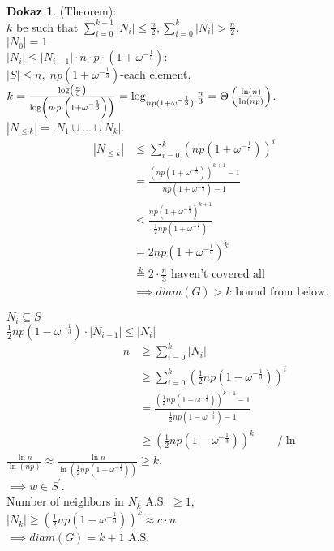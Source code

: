 \documentclass[a4paper, 12pt]{book}
\theoremstyle{definition}
\newtheorem{pro}[counter]{Dokaz}
\theoremstyle{remark}
\begin{document}
\begin{pro}(Theorem): \\
  $k$ be such that $\sum_{i=0}^{k-1} |N_i| \leq \frac{n}{2}, \sum_{i=0}^{k} |N_i| > \frac{n}{2}$. \\
  $|N_0| = 1$ \\
  $|N_i| \leq |N_{i-1}| \cdot n \cdot p \cdot (1+\omega^{-\frac{1}{3}})$: \\
  $|S| \leq n, \; np(1+\omega^{-\frac{1}{3}})$-each element. \\
  $k = \frac{\log \left(\frac{n}{3}\right)}{\log \left(n \cdot p \cdot \left(1+\omega^{-\frac{1}{3}}\right)\right)} \\
  = \log_{np(1+\omega^{-\frac{1}{3}})} \frac{n}{3} = \Theta\left(\frac{\ln(n)}{\ln(np)}\right)$. \\
  $|N_{\leq k}| = |N_1 \cup \dots \cup N_k|$.
  \begin{align*}
    |N_{\leq k}| &\leq \sum_{i=0}^{k} (np(1+\omega^{-\frac{1}{3}}))^i \\
    &= \frac{(np(1+\omega^{-\frac{1}{3}}))^{k+1}-1}{np(1+\omega^{-\frac{1}{3}}) - 1} \\
    &< \frac{np(1+\omega^{-\frac{1}{3}})^{k+1}}{\frac{1}{2} np(1+\omega^{-\frac{1}{3}})} \\
    &= 2 np(1+\omega^{-\frac{1}{3}})^k \\
    &\stackrel{k}{=} 2 \cdot \frac{n}{3} \text{ haven't covered all} \\
    &\implies diam(G) > k \text{ bound from below}.
  \end{align*}



  $N_i \subseteq S$ \\
  $\frac{1}{2} n p \left(1-\omega^{-\frac{1}{3}}\right) \cdot |N_{i-1}| \leq |N_i|$ \\
  \begin{align*}
    n & \geq \sum_{i=0}^{k} |N_i| \\
    & \geq \sum_{i=0}^{k} \left(\frac{1}{2} n p \left(1-\omega^{-\frac{1}{3}}\right)\right)^i \\
    &= \frac{\left(\frac{1}{2} n p \left(1-\omega^{-\frac{1}{3}}\right)\right)^{k+1} - 1}
      {\frac{1}{2} n p \left(1-\omega^{-\frac{1}{3}}\right) - 1} \\
    &\geq \left(\frac{1}{2} n p \left(1-\omega^{-\frac{1}{3}}\right)\right)^k \qquad / \ln
  \end{align*}
  $\frac{\ln n}{\ln (np)} \approx \frac{\ln n}{\ln \left(\frac{1}{2} n p \left(1-\omega^{-\frac{1}{3}}\right)\right)} \geq k$. \\
  $\implies w \in S^{'}$. \\
  Number of neighbors in $N_k$ A.S. $\geq 1$, \\
  $|N_k| \geq \left(\frac{1}{2} n p \left(1-\omega^{-\frac{1}{3}}\right)\right)^k \approx c \cdot n$ \\
  $\implies diam (G) = k + 1 $ A.S.
\end{pro}
\end{document}
